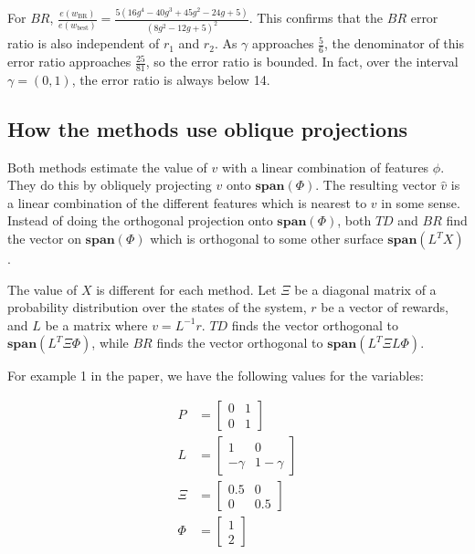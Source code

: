\documentclass{article}
\newcommand\mspan[1]{\textbf{span}(#1)}
\begin{document}
For $BR$, $\frac{e(w_{\text{BR}})}{e(w_{\text{best}})} = \frac{5 \left(16 g^4-40 g^3+45 g^2-24 g+5\right)}{\left(8 g^2-12 g+5\right)^2}$. This confirms that the $BR$ error ratio is also independent of $r_1$ and $r_2$. As $\gamma$ approaches $\frac{5}{6}$, the denominator of this error ratio approaches $\frac{25}{81}$, so the error ratio is bounded. In fact, over the interval $\gamma = (0,1)$, the error ratio is always below 14.

\subsection{How the methods use oblique projections}

Both methods estimate the value of $v$ with a linear combination of features $\phi$. They do this by obliquely projecting $v$ onto $\mspan{\Phi}$. The resulting vector $\hat{v}$ is a linear combination of the different features which is nearest to $v$ in some sense. Instead of doing the orthogonal projection onto $\mspan{\Phi}$, both $TD$ and $BR$ find the vector on $\mspan{\Phi}$ which is orthogonal to some other surface $\mspan{L^TX}$.

The value of $X$ is different for each method. Let $\Xi$ be a diagonal matrix of a probability distribution over the states of the system, $r$ be a vector of rewards, and $L$ be a matrix where $v = L^{-1}r$. $TD$ finds the vector orthogonal to $\mspan{L^T\Xi\Phi}$, while $BR$ finds the vector orthogonal to $\mspan{L^T\Xi L \Phi}$.

For example 1 in the paper, we have the following values for the variables:

\begin{align}
P &= \begin{bmatrix}
  0 & 1 \\
  0 & 1
\end{bmatrix} \\
L &= \begin{bmatrix}
  1 & 0 \\
  -\gamma & 1-\gamma
\end{bmatrix} \\
\Xi &= \begin{bmatrix}
  0.5 & 0 \\
  0 & 0.5
\end{bmatrix} \\
\Phi &= \begin{bmatrix}
  1 \\
  2
\end{bmatrix}
\end{align}
\end{document}
